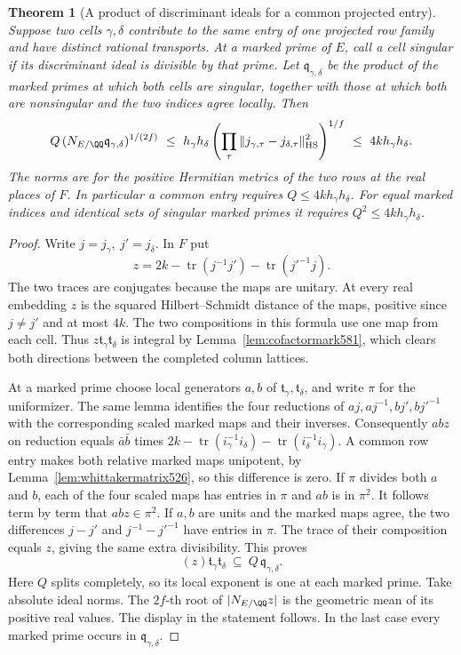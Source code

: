 \documentclass[a4paper,11pt]{article}
\newtheorem{theorem}[proposition]{Theorem}
\theoremstyle{definition}
\theoremstyle{remark}
\numberwithin{equation}{section}
\begin{document}
\begin{theorem}[A product of discriminant ideals for a common projected entry]
\leavevmode\label{thm:transportproduct589}
Suppose two cells \(\gamma,\delta\) contribute to the same
entry of one projected row family and have distinct rational
transports. At a marked prime of \(E\), call a cell singular
if its discriminant ideal is divisible by that prime. Let
\(\mathfrak q_{\gamma,\delta}\) be the product of the marked
primes at which both cells are singular, together with those
at which both are nonsingular and the two indices agree locally.
Then
\[
 Q\,(N_{E/\QQ}\mathfrak q_{\gamma,\delta})^{1/(2f)}
 \ \le\ h_\gamma h_\delta
       \left(\prod_\tau
       \|j_{\gamma,\tau}-j_{\delta,\tau}\|_{\rm HS}^2\right)^{1/f}
 \ \le\ 4k h_\gamma h_\delta .
\]
The norms are for the positive Hermitian metrics of the two
rows at the real places of \(F\). In particular a common
entry requires \(Q\le4k h_\gamma h_\delta\). For equal
marked indices and identical sets of singular marked primes
it requires \(Q^2\le4k h_\gamma h_\delta\).
\end{theorem}
\begin{proof}
Write \(j=j_\gamma,\ j'=j_\delta\). In \(F\) put
\[
 z=2k-\operatorname{tr}(j^{-1}j')
          -\operatorname{tr}({j'}^{-1}j).
\]
The two traces are conjugates because the maps are unitary.
At every real embedding \(z\) is the squared Hilbert--Schmidt
distance of the maps, positive since \(j\ne j'\) and at most
\(4k\). The two compositions in this formula use one map
from each cell. Thus \(z\mathfrak t_\gamma\mathfrak t_\delta\)
is integral by Lemma~\ref{lem:cofactormark581}, which clears
both directions between the completed column lattices.

At a marked prime choose local generators \(a,b\) of
\(\mathfrak t_\gamma,\mathfrak t_\delta\), and write
\(\pi\) for the uniformizer. The same lemma identifies the
four reductions of \(aj,aj^{-1},bj',b{j'}^{-1}\) with
the corresponding scaled marked maps and their inverses.
Consequently \(abz\) on reduction equals \(\bar a\bar b\)
times \(2k-\operatorname{tr}(i_\gamma^{-1}i_\delta)
-\operatorname{tr}(i_\delta^{-1}i_\gamma)\). A common row
entry makes both relative marked maps unipotent, by
Lemma~\ref{lem:whittakermatrix526}, so this difference is zero.
If \(\pi\) divides both \(a\) and \(b\), each of the four
scaled maps has entries in \(\pi\) and \(ab\) is in \(\pi^2\).
It follows term by term that \(abz\in\pi^2\).
If \(a,b\) are units and the marked maps agree, the two
differences \(j-j'\) and \(j^{-1}-{j'}^{-1}\) have entries
in \(\pi\). The trace of their composition equals \(z\),
giving the same extra divisibility. This proves
\[
             (z)\mathfrak t_\gamma\mathfrak t_\delta
                     \ \subseteq\ Q\,\mathfrak q_{\gamma,\delta}.
\]
Here \(Q\) splits completely, so its local exponent is one
at each marked prime. Take absolute ideal norms. The
\(2f\)-th root of \(|N_{E/\QQ}z|\) is the geometric mean
of its positive real values. The display in the statement
follows. In the last case every marked prime occurs in
\(\mathfrak q_{\gamma,\delta}\).
\end{proof}
\end{document}

